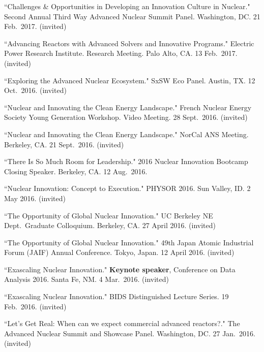 \begin{bibsection}
\item ``Challenges \& Opportunities in Developing an Innovation Culture in Nuclear." Second Annual Third Way Advanced Nuclear Summit Panel. Washington, DC. 21 Feb.\ 2017. (invited)

\item ``Advancing Reactors with Advanced Solvers and Innovative Programs." Electric Power Research Institute. Research Meeting. Palo Alto, CA. 13 Feb.\ 2017. (invited)

\item ``Exploring the Advanced Nuclear Ecosystem." SxSW Eco Panel. Austin, TX. 12 Oct.\ 2016. (invited)

\item ``Nuclear and Innovating the Clean Energy Landscape." French Nuclear Energy Society Young Generation Workshop. Video Meeting. 28 Sept.\ 2016. (invited)

\item ``Nuclear and Innovating the Clean Energy Landscape." NorCal ANS Meeting. Berkeley, CA. 21 Sept.\ 2016. (invited)

\item  ``There Is So Much Room for Leadership." 2016 Nuclear Innovation Bootcamp Closing Speaker. Berkeley, CA. 12 Aug.\ 2016.\\

\item ``Nuclear Innovation: Concept to Execution." PHYSOR 2016. Sun Valley, ID. 2 May 2016. (invited)

\item ``The Opportunity of Global Nuclear Innovation." UC Berkeley NE Dept.\ Graduate Colloquium. Berkeley, CA. 27 April 2016. (invited)

\item  ``The Opportunity of Global Nuclear Innovation." 49th Japan Atomic Industrial Forum (JAIF) Annual Conference. Tokyo, Japan. 12 April 2016. (invited)

\item ``Exascaling Nuclear Innovation." \textbf{Keynote speaker}, Conference on Data Analysis 2016. Santa Fe, NM. 4 Mar.\ 2016. (invited) 

\item ``Exascaling Nuclear Innovation." BIDS Distinguished Lecture Series. 19 Feb.\ 2016. (invited) 

\item ``Let’s Get Real: When can we expect commercial
advanced reactors?." The Advanced Nuclear Summit and Showcase Panel. Washington, DC. 27 Jan.\ 2016. (invited)


\end{bibsection}

